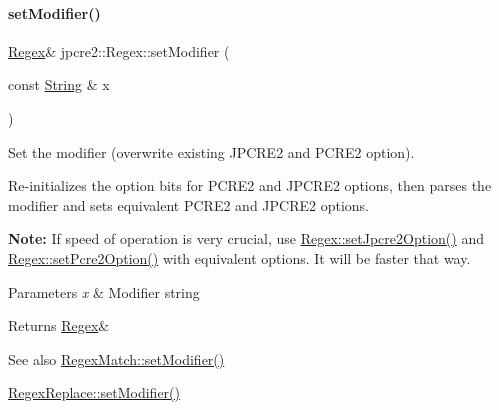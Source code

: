 \paragraph{\texorpdfstring{set\+Modifier()}{setModifier()}}
{\footnotesize\ttfamily \hyperlink{classjpcre2_1_1Regex}{Regex}\& jpcre2\+::\+Regex\+::set\+Modifier (\begin{DoxyParamCaption}\item[{const \hyperlink{namespacejpcre2_a91f03070152fb228bc116c5a737f1d16}{String} \&}]{x }\end{DoxyParamCaption})\hspace{0.3cm}{\ttfamily [inline]}}



Set the modifier (overwrite existing J\+P\+C\+R\+E2 and P\+C\+R\+E2 option). 

Re-\/initializes the option bits for P\+C\+R\+E2 and J\+P\+C\+R\+E2 options, then parses the modifier and sets equivalent P\+C\+R\+E2 and J\+P\+C\+R\+E2 options.

{\bfseries Note\+:} If speed of operation is very crucial, use \hyperlink{classjpcre2_1_1Regex_a031617a19638ef752dcd2b29fa3464d5_a031617a19638ef752dcd2b29fa3464d5}{Regex\+::set\+Jpcre2\+Option()} and \hyperlink{classjpcre2_1_1Regex_acdc6f97f4030ae109c4e1a4e2310bceb_acdc6f97f4030ae109c4e1a4e2310bceb}{Regex\+::set\+Pcre2\+Option()} with equivalent options. It will be faster that way. 
\begin{DoxyParams}{Parameters}
{\em x} & Modifier string \\
\hline
\end{DoxyParams}
\begin{DoxyReturn}{Returns}
\hyperlink{classjpcre2_1_1Regex}{Regex}\& 
\end{DoxyReturn}
\begin{DoxySeeAlso}{See also}
\hyperlink{classjpcre2_1_1RegexMatch_a9df7e92f96b61553f62720cb8f5f23e5_a9df7e92f96b61553f62720cb8f5f23e5}{Regex\+Match\+::set\+Modifier()} 

\hyperlink{classjpcre2_1_1RegexReplace_ae2abe2994b0fbe54950f88e63000c910_ae2abe2994b0fbe54950f88e63000c910}{Regex\+Replace\+::set\+Modifier()} 
\end{DoxySeeAlso}
\hypertarget{classjpcre2_1_1Regex_a85d9a514ea86ae68533223adac6c6bd8_a85d9a514ea86ae68533223adac6c6bd8}{}\label{classjpcre2_1_1Regex_a85d9a514ea86ae68533223adac6c6bd8_a85d9a514ea86ae68533223adac6c6bd8} 
